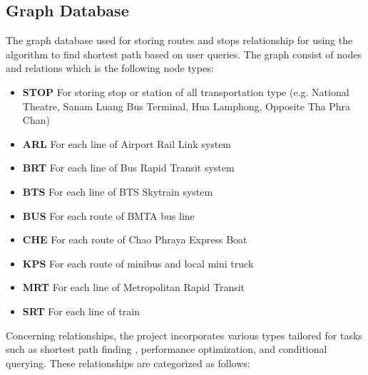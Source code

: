 \subsection{Graph Database}
The graph database used for storing routes and stops relationship for using the algorithm to find shortest path based on user queries. The graph consist of nodes and relations which is the following node types:
\begin{itemize}
	\item \textbf{STOP} For storing stop or station of all transportation type (e.g. National Theatre, Sanam Luang Bus Terminal, Hua Lamphong, Opposite Tha Phra Chan)
	\item \textbf{ARL} For each line of Airport Rail Link system
	\item \textbf{BRT} For each line of Bus Rapid Transit system
	\item \textbf{BTS} For each line of BTS Skytrain system
	\item \textbf{BUS} For each route of BMTA bus line
	\item \textbf{CHE} For each route of Chao Phraya Express Boat
	\item \textbf{KPS} For each route of minibus and local mini truck
	\item \textbf{MRT} For each line of Metropolitan Rapid Transit
	\item \textbf{SRT} For each line of train
\end{itemize}
\par
Concerning relationships, the project incorporates various types tailored for tasks such as shortest path finding  \cite{neo4j2}, performance optimization, and conditional querying. These relationships are categorized as follows:

\newpage
